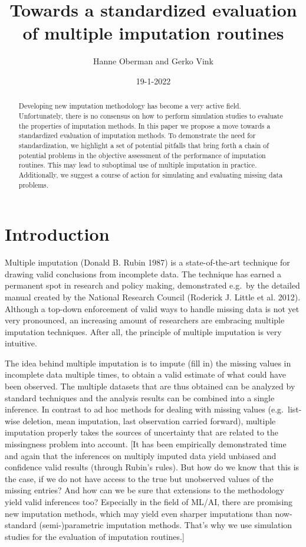 \documentclass[
]{article}
\title{Towards a standardized evaluation of multiple imputation
routines}
\author{Hanne Oberman and Gerko Vink}
\date{19-1-2022}
\begin{document}
\maketitle
\begin{abstract}
Developing new imputation methodology has become a very active field.
Unfortunately, there is no consensus on how to perform simulation
studies to evaluate the properties of imputation methods. In this paper
we propose a move towards a standardized evaluation of imputation
methods. To demonstrate the need for standardization, we highlight a set
of potential pitfalls that bring forth a chain of potential problems in
the objective assessment of the performance of imputation routines. This
may lead to suboptimal use of multiple imputation in practice.
Additionally, we suggest a course of action for simulating and
evaluating missing data problems.
\end{abstract}

\hypertarget{introduction}{%
\section{Introduction}\label{introduction}}

Multiple imputation (Donald B. Rubin 1987) is a state-of-the-art
technique for drawing valid conclusions from incomplete data. The
technique has earned a permanent spot in research and policy making,
demonstrated e.g.~by the detailed manual created by the National
Research Council (Roderick J. Little et al. 2012). Although a top-down
enforcement of valid ways to handle missing data is not yet very
pronounced, an increasing amount of researchers are embracing multiple
imputation techniques. After all, the principle of multiple imputation
is very intuitive.

The idea behind multiple imputation is to impute (fill in) the missing
values in incomplete data multiple times, to obtain a valid estimate of
what could have been observed. The multiple datasets that are thus
obtained can be analyzed by standard techniques and the analysis results
can be combined into a single inference. In contrast to ad hoc methods
for dealing with missing values (e.g.~list-wise deletion, mean
imputation, last observation carried forward), multiple imputation
properly takes the sources of uncertainty that are related to the
missingness problem into account. {[}It has been empirically
demonstrated time and again that the inferences on multiply imputed data
yield unbiased and confidence valid results (through Rubin's rules). But
how do we know that this is the case, if we do not have access to the
true but unobserved values of the missing entries? And how can we be
sure that extensions to the methodology yield valid inferences too?
Especially in the field of ML/AI, there are promising new imputation
methods, which may yield even sharper imputations than now-standard
(semi-)parametric imputation methods. That's why we use simulation
studies for the evaluation of imputation routines.{]}
\end{document}
